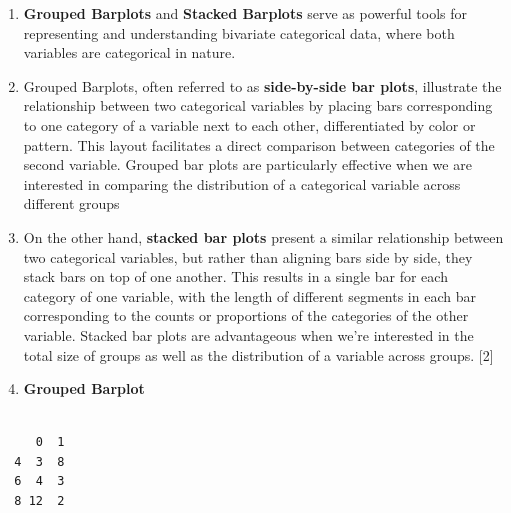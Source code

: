 \documentclass[
  letterpaper,
  DIV=11,
  numbers=noendperiod]{scrreport}
\newenvironment{Shaded}{\begin{snugshade}}{\end{snugshade}}
\newcommand{\CommentTok}[1]{\textcolor[rgb]{0.37,0.37,0.37}{#1}}
\newcommand{\FunctionTok}[1]{\textcolor[rgb]{0.28,0.35,0.67}{#1}}
\newcommand{\NormalTok}[1]{\textcolor[rgb]{0.00,0.23,0.31}{#1}}
\newcommand{\OtherTok}[1]{\textcolor[rgb]{0.00,0.23,0.31}{#1}}
\newcommand{\SpecialCharTok}[1]{\textcolor[rgb]{0.37,0.37,0.37}{#1}}
\begin{document}
\begin{enumerate}
\def\labelenumi{\arabic{enumi}.}
\item
  \textbf{Grouped Barplots} and \textbf{Stacked Barplots} serve as
  powerful tools for representing and understanding bivariate
  categorical data, where both variables are categorical in nature.
\item
  Grouped Barplots, often referred to as \textbf{side-by-side bar
  plots}, illustrate the relationship between two categorical variables
  by placing bars corresponding to one category of a variable next to
  each other, differentiated by color or pattern. This layout
  facilitates a direct comparison between categories of the second
  variable. Grouped bar plots are particularly effective when we are
  interested in comparing the distribution of a categorical variable
  across different groups
\item
  On the other hand, \textbf{stacked bar plots} present a similar
  relationship between two categorical variables, but rather than
  aligning bars side by side, they stack bars on top of one another.
  This results in a single bar for each category of one variable, with
  the length of different segments in each bar corresponding to the
  counts or proportions of the categories of the other variable. Stacked
  bar plots are advantageous when we're interested in the total size of
  groups as well as the distribution of a variable across groups.
  {[}2{]}
\item
  \textbf{Grouped Barplot}
\end{enumerate}

\begin{Shaded}
\end{Shaded}

\begin{verbatim}
   
     0  1
  4  3  8
  6  4  3
  8 12  2
\end{verbatim}
\end{document}
